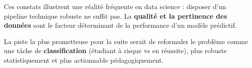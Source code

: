 \documentclass[12pt, a4paper, french]{report}
\begin{document}
Ces constats illustrent une réalité fréquente en data science : disposer d'un pipeline technique robuste ne suffit pas. La \textbf{qualité et la pertinence des données} sont le facteur déterminant de la performance d'un modèle prédictif.

La piste la plus prometteuse pour la suite serait de reformuler le problème comme une tâche de \textbf{classification} (étudiant à risque vs en réussite), plus robuste statistiquement et plus actionnable pédagogiquement.
\end{document}
